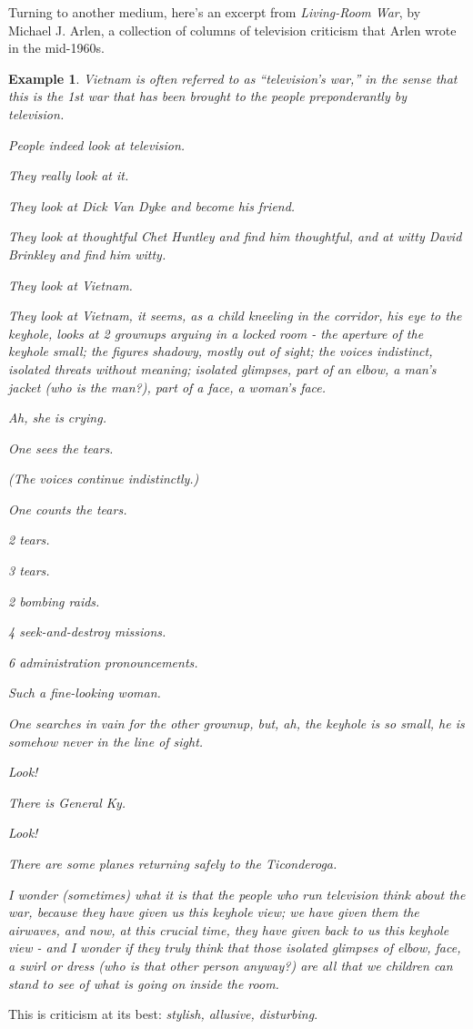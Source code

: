 \documentclass{book}
\numberwithin{equation}{section}
\newtheorem{example}{Example}[chapter]
\begin{document}
Turning to another medium, here's an excerpt from \textit{Living-Room War}, by Michael J. Arlen, a collection of columns of television criticism that Arlen wrote in the mid-1960s.
\begin{example}
    Vietnam is often referred to as ``television's war,'' in the sense that this is the 1st war that has been brought to the people preponderantly by television.
    
    People indeed look at television.
    
    They really look at it.
    
    They look at Dick Van Dyke and become his friend.
    
    They look at thoughtful Chet Huntley and find him thoughtful, and at witty David Brinkley and find him witty.
    
    They look at Vietnam.
    
    They look at Vietnam, it seems, as a child kneeling in the corridor, his eye to the keyhole, looks at 2 grownups arguing in a locked room - the aperture of the keyhole small; the figures shadowy, mostly out of sight; the voices indistinct, isolated threats without meaning; isolated glimpses, part of an elbow, a man's jacket (who is the man?), part of a face, a woman's face.
    
    Ah, she is crying.
    
    One sees the tears.
    
    (The voices continue indistinctly.)
    
    One counts the tears.
    
    2 tears.
    
    3 tears.
    
    2 bombing raids.
    
    4 seek-and-destroy missions.
    
    6 administration pronouncements.
    
    Such a fine-looking woman.
    
    One searches in vain for the other grownup, but, ah, the keyhole is so small, he is somehow never in the line of sight.
    
    Look!
    
    There is General Ky.
    
    Look!
    
    There are some planes returning safely to the \emph{Ticonderoga}.
    
    I wonder (sometimes) what it is that the people who run television think about the war, because \emph{they} have given us this keyhole view; we have given them the airwaves, and now, at this crucial time, they have given back to us this keyhole view - and I wonder if they truly think that those isolated glimpses of elbow, face, a swirl or dress (who \emph{is} that other person anyway?) are all that we children can stand to see of what is going on inside the room.
\end{example}
This is criticism at its best: \textit{stylish, allusive, disturbing}.
\end{document}
